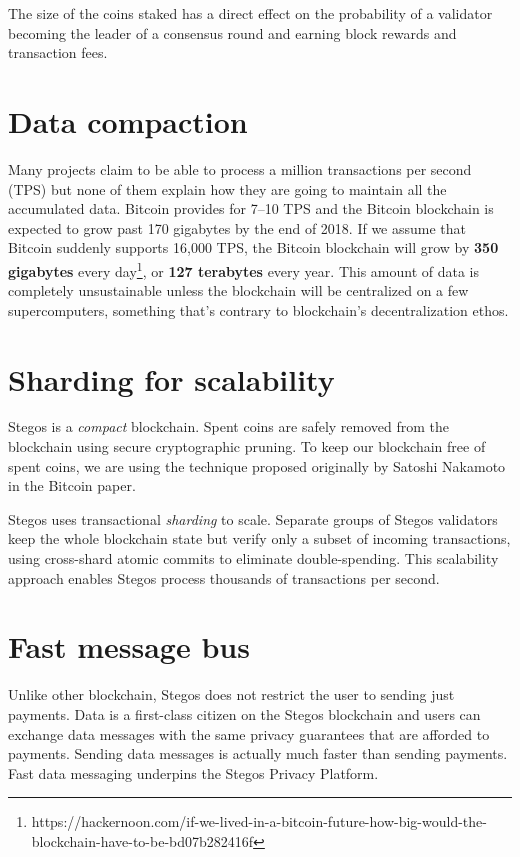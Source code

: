 \documentclass[8pt,fleqn,openany]{book}
\begin{document}
The size of the coins staked has a direct effect on the probability of a validator becoming the leader of a consensus round and earning block rewards and transaction fees.

\section{Data compaction}
Many projects claim to be able to process a million transactions per second (TPS) but none of them explain how they are going to maintain all the accumulated data. Bitcoin provides for 7--10 TPS and the Bitcoin blockchain is expected to grow past 170 gigabytes by the end of 2018. If we assume that Bitcoin suddenly supports 16,000 TPS, the Bitcoin blockchain will grow by \textbf{350 gigabytes} every day\footnote{https://hackernoon.com/if-we-lived-in-a-bitcoin-future-how-big-would-the-blockchain-have-to-be-bd07b282416f}, or \textbf{127 terabytes} every year. This amount of data is completely unsustainable unless the blockchain will be centralized on a few supercomputers, something that’s contrary to blockchain’s decentralization ethos.

\section{Sharding for scalability}
Stegos is a \textit{compact} blockchain. Spent coins are safely removed from the blockchain using secure cryptographic pruning. To keep our blockchain free of spent coins, we are using the technique proposed originally by Satoshi Nakamoto in the Bitcoin paper\cite{c1}.

Stegos uses transactional \textit{sharding} to scale. Separate groups of Stegos validators keep the whole blockchain state but verify only a subset of incoming transactions, using cross-shard atomic commits to eliminate double-spending. This scalability approach enables Stegos process thousands of transactions per second.

\section{Fast message bus}
Unlike other blockchain, Stegos does not restrict the user to sending just payments. Data is a first-class citizen on the Stegos blockchain and users can exchange data messages with the same privacy guarantees that are afforded to payments. Sending data messages is actually much faster than sending payments. Fast data messaging underpins the Stegos Privacy Platform. 
\end{document}
